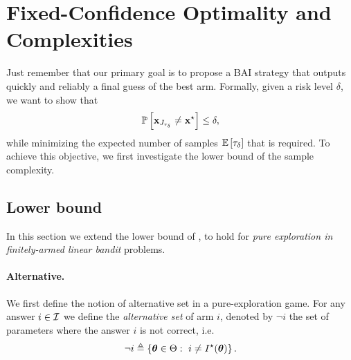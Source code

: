 \section{Fixed-Confidence Optimality and Complexities}\label{sec:lgc.complexity}

Just remember that our primary goal is to propose a BAI strategy that outputs quickly and reliably a final guess of the best arm. Formally, given a risk level $\delta$, we want to show that
\[
  \mathbb{P}\left[{\bf x}_{J_{\tau_\delta}}\neq {\bf x}^\star\right] \leq \delta,
\]
while minimizing the expected number of samples $\mathbb{E}\left[\tau_\delta\right]$ that is required. To achieve this objective, we first investigate the lower bound of the sample complexity.

\subsection{Lower bound}\label{sec:lgc.complexity.lb}

In this section we extend the lower bound of \citet{garivier2016tracknstop}, to hold for \emph{pure exploration in finitely-armed linear bandit} problems.

\paragraph{Alternative.}
We first define the notion of \gls{alternative set} in a pure-exploration game. For any answer $i\in\mathcal{I}$ we define the \emph{alternative set} of arm $i$, denoted by $\neg i$ the set of parameters where the answer $i$ is not correct, i.e.
\[
    \neg i \triangleq \{{\boldsymbol \theta}\in\Theta:\ i\neq I^\star({\boldsymbol \theta})\}\,.
\]


